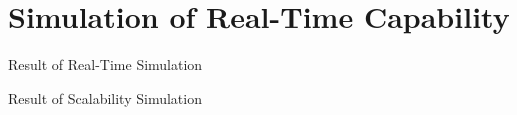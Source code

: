 
\section{Simulation of Real-Time Capability}

\begin{frame}{Result of Real-Time Simulation}

\end{frame}

\begin{frame}{Result of Scalability Simulation}

\end{frame}